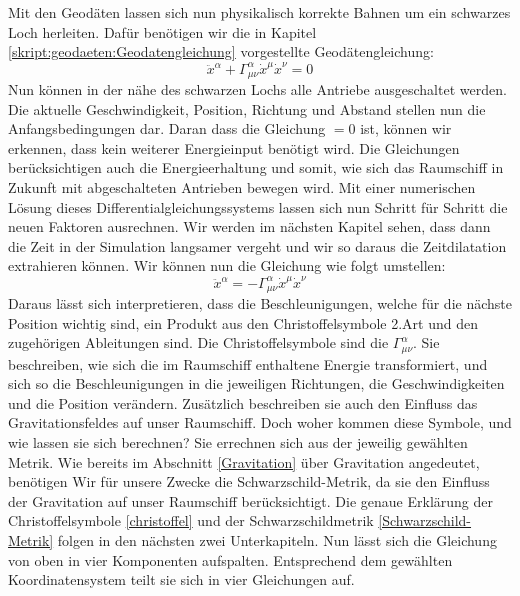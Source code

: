 \begin{refsection}
	Mit den Geodäten lassen sich nun physikalisch korrekte Bahnen um ein schwarzes Loch herleiten. Dafür benötigen wir die in Kapitel \ref{skript:geodaeten:Geodatengleichung}
	vorgestellte Geodätengleichung:	
	\begin{equation}
	\ddot{x}^{\alpha} + \Gamma^{\alpha}_{\mu\nu}\dot{x}^{\mu}\dot{x}^{\nu} = 0
	\end{equation}
	Nun können in der nähe des schwarzen Lochs alle Antriebe ausgeschaltet werden. Die aktuelle Geschwindigkeit, Position, Richtung und Abstand stellen nun die Anfangsbedingungen dar. Daran dass die Gleichung $=0$ ist, können wir erkennen, dass kein weiterer Energieinput benötigt wird. Die Gleichungen berücksichtigen auch die Energieerhaltung und somit, wie sich das Raumschiff in Zukunft mit abgeschalteten Antrieben bewegen wird. Mit einer numerischen Lösung dieses Differentialgleichungssystems lassen sich nun Schritt für Schritt die neuen Faktoren ausrechnen. Wir werden im nächsten Kapitel sehen, dass dann die Zeit in der Simulation langsamer vergeht und wir so daraus die Zeitdilatation extrahieren können.
	Wir k\"onnen nun die Gleichung wie folgt umstellen:	
	\begin{equation}
	\ddot{x}^{\alpha} = -\Gamma^{\alpha}_{\mu\nu}\dot{x}^{\mu}\dot{x}^{\nu}
	\end{equation}
	Daraus lässt sich interpretieren, dass die Beschleunigungen, welche für die nächste Position wichtig sind, ein Produkt aus den Christoffelsymbole 2.Art und den zugehörigen Ableitungen sind. Die Christoffelsymbole sind die $\Gamma^{\alpha}_{\mu\nu}$. Sie beschreiben, wie sich die im Raumschiff enthaltene Energie transformiert, und sich so die Beschleunigungen in die jeweiligen Richtungen, die Geschwindigkeiten und die Position verändern. Zusätzlich beschreiben sie auch den Einfluss das Gravitationsfeldes auf unser Raumschiff.
	Doch woher kommen diese Symbole, und wie lassen sie sich berechnen?
	Sie errechnen sich aus der jeweilig gewählten Metrik. Wie bereits im Abschnitt \ref{Gravitation} über Gravitation angedeutet, benötigen Wir für unsere Zwecke die Schwarzschild-Metrik, da sie den Einfluss der Gravitation auf unser Raumschiff berücksichtigt. Die genaue Erklärung der Christoffelsymbole \ref{christoffel} und der Schwarzschildmetrik \ref{Schwarzschild-Metrik} folgen in den nächsten zwei Unterkapiteln.
	Nun lässt sich die Gleichung von oben in vier Komponenten aufspalten.
	Entsprechend dem gewählten Koordinatensystem teilt sie sich in vier Gleichungen auf.
	\begin{align*}

\end{align*}
\end{refsection}
